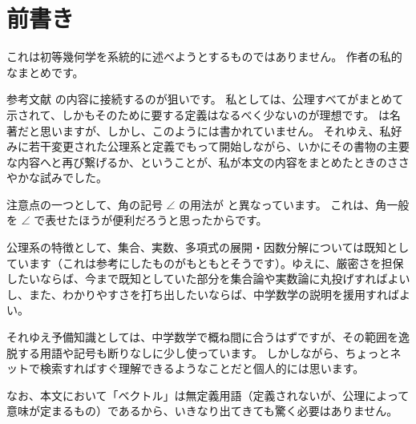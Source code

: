 \chapter*{前書き}

これは初等幾何学を系統的に述べようとするものではありません。
作者の私的なまとめです。

参考文献 \cite{seki} の内容に接続するのが狙いです。
私としては、公理すべてがまとめて示されて、しかもそのために要する定義はなるべく少ないのが理想です。
\cite{seki} は名著だと思いますが、しかし、このようには書かれていません。
それゆえ、私好みに若干変更された公理系と定義でもって開始しながら、いかにその書物の主要な内容へと再び繋げるか、ということが、私が本文の内容をまとめたときのささやかな試みでした。

注意点の一つとして、角の記号 \(\angle\) の用法が \cite{seki} と異なっています。
これは、角一般を \(\angle\) で表せたほうが便利だろうと思ったからです。

公理系の特徴として、集合、実数、多項式の展開・因数分解については既知としています（これは参考にしたものがもともとそうです）。ゆえに、厳密さを担保したいならば、今まで既知としていた部分を集合論や実数論に丸投げすればよいし、また、わかりやすさを打ち出したいならば、中学数学の説明を援用すればよい。

それゆえ予備知識としては、中学数学で概ね間に合うはずですが、その範囲を逸脱する用語や記号も断りなしに少し使っています。
しかしながら、ちょっとネットで検索すればすぐ理解できるようなことだと個人的には思います。

なお、本文において「ベクトル」は無定義用語（定義されないが、公理によって意味が定まるもの）であるから、いきなり出てきても驚く必要はありません。
